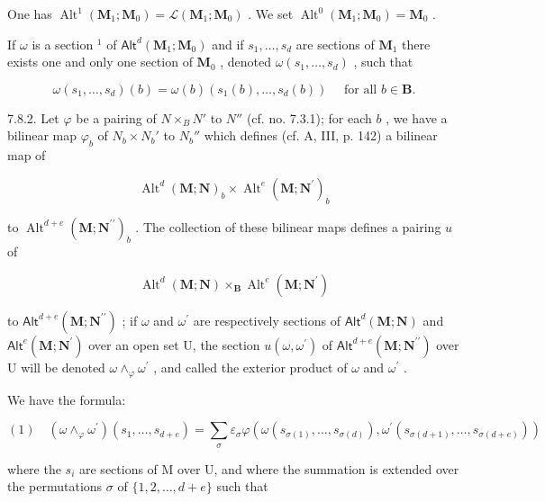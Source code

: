One has \(\operatorname{Alt}^1 (\mathbf{M}_1;\mathbf{M}_0) = \mathcal{L}(\mathbf{M}_1;\mathbf{M}_0)\) . We set \(\operatorname{Alt}^0 (\mathbf{M}_1;\mathbf{M}_0) = \mathbf{M}_0\) .

If \(\omega\) is a section \(^{1}\) of \(\mathsf{Alt}^{d}(\mathbf{M}_{1};\mathbf{M}_{0})\) and if \(s_{1},\ldots,s_{d}\) are sections of \(\mathbf{M}_{1}\) there exists one and only one section of \(\mathbf{M}_{0}\) , denoted \(\omega(s_{1},\ldots,s_{d})\) , such that

\[
\omega (s _ {1}, \dots , s _ {d}) (b) = \omega (b) (s _ {1} (b), \dots , s _ {d} (b)) \quad \text { for all } b \in \mathbf {B}.
\]

7.8.2. Let \(\varphi\) be a pairing of \(N \times_{B} N'\) to \(N''\) (cf. no. 7.3.1); for each \(b\) , we have a bilinear map \(\varphi_b\) of \(N_b \times N_b'\) to \(N_b''\) which defines (cf. A, III, p. 142) a bilinear map of

\[
\operatorname{Alt} ^ {d} (\mathbf {M}; \mathbf {N}) _ {b} \times \operatorname{Alt} ^ {e} (\mathbf {M}; \mathbf {N} ^ {\prime}) _ {b}
\]

to \(\operatorname{Alt}^{d + e}(\mathbf{M};\mathbf{N}^{\prime \prime})_{b}\) . The collection of these bilinear maps defines a pairing \(u\) of

\[
\operatorname{Alt} ^ {d} (\mathbf {M}; \mathbf {N}) \times_ {\mathbf {B}} \operatorname{Alt} ^ {e} (\mathbf {M}; \mathbf {N} ^ {\prime})
\]

to \(\mathsf{Alt}^{d + e}(\mathbf{M};\mathbf{N}^{\prime \prime})\) ; if \(\omega\) and \(\omega^{\prime}\) are respectively sections of \(\mathsf{Alt}^{d}(\mathbf{M};\mathbf{N})\) and \(\mathsf{Alt}^{e}(\mathbf{M};\mathbf{N}^{\prime})\) over an open set U, the section \(u(\omega ,\omega^{\prime})\) of \(\mathsf{Alt}^{d + e}(\mathbf{M};\mathbf{N}^{\prime \prime})\) over U will be denoted \(\omega \wedge_{\varphi}\omega^{\prime}\) , and called the exterior product of \(\omega\) and \(\omega^{\prime}\) .

We have the formula:

\[
(1) \quad \left(\omega \wedge_ {\varphi} \omega^ {\prime}\right) \left(s _ {1}, \dots , s _ {d + e}\right) = \sum_ {\sigma} \varepsilon_ {\sigma} \varphi \left(\omega \left(s _ {\sigma (1)}, \dots , s _ {\sigma (d)}\right), \omega^ {\prime} \left(s _ {\sigma (d + 1)}, \dots , s _ {\sigma (d + e)}\right)\right)
\]

where the \(s_{i}\) are sections of M over U, and where the summation is extended over the permutations \(\sigma\) of \(\{1,2,\ldots,d+e\}\) such that

